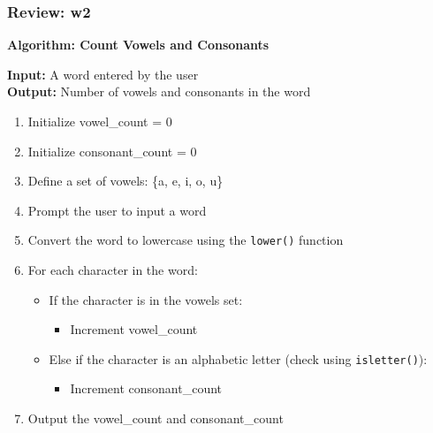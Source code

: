 \documentclass[
	11pt, %
]{beamer}
\begin{document}
\begin{frame}
	\frametitle{Review: w2}

	\textbf{Algorithm: Count Vowels and Consonants}

\textbf{Input:} A word entered by the user \\
\textbf{Output:} Number of vowels and consonants in the word

\begin{enumerate}
    \item Initialize vowel\_count = 0
    \item Initialize consonant\_count = 0
    \item Define a set of vowels: \{a, e, i, o, u\}
    \item Prompt the user to input a word
    \item Convert the word to lowercase using the \texttt{lower()} function
    \item For each character in the word:
    \begin{itemize}
        \item If the character is in the vowels set:
        \begin{itemize}
            \item Increment vowel\_count
        \end{itemize}
        \item Else if the character is an alphabetic letter (check using \texttt{isletter()}):
        \begin{itemize}
            \item Increment consonant\_count
        \end{itemize}
    \end{itemize}
    \item Output the vowel\_count and consonant\_count
\end{enumerate}

\end{frame}

\end{document}
